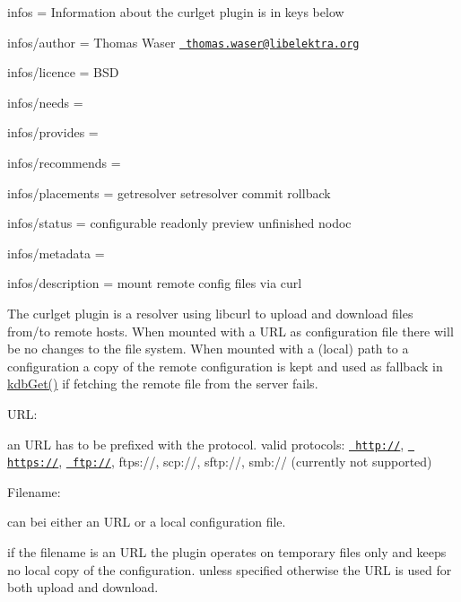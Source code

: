 
\begin{DoxyItemize}
\item infos = Information about the curlget plugin is in keys below
\item infos/author = Thomas Waser \href{mailto:thomas.waser@libelektra.org}{\texttt{ thomas.\+waser@libelektra.\+org}}
\item infos/licence = B\+SD
\item infos/needs =
\item infos/provides =
\item infos/recommends =
\item infos/placements = getresolver setresolver commit rollback
\item infos/status = configurable readonly preview unfinished nodoc
\item infos/metadata =
\item infos/description = mount remote config files via curl
\end{DoxyItemize}

The {\ttfamily curlget} plugin is a resolver using libcurl to upload and download files from/to remote hosts. When mounted with a {\ttfamily U\+RL} as configuration file there will be no changes to the file system. When mounted with a (local) path to a configuration a copy of the remote configuration is kept and used as fallback in {\ttfamily \mbox{\hyperlink{group__kdb_ga28e385fd9cb7ccfe0b2f1ed2f62453a1}{kdb\+Get()}}} if fetching the remote file from the server fails.

{\ttfamily U\+RL}\+:

an U\+RL has to be prefixed with the protocol. valid protocols\+: {\ttfamily \href{http://}{\texttt{ http\+://}}}, {\ttfamily \href{https://}{\texttt{ https\+://}}}, {\ttfamily \href{ftp://}{\texttt{ ftp\+://}}}, {\ttfamily ftps\+://}, {\ttfamily scp\+://}, {\ttfamily sftp\+://}, {\ttfamily smb\+://} (currently not supported)

{\ttfamily Filename}\+:

can bei either an {\ttfamily U\+RL} or a local configuration file.

if the filename is an {\ttfamily U\+RL} the plugin operates on temporary files only and keeps no local copy of the configuration. unless specified otherwise the {\ttfamily U\+RL} is used for both upload and download.


